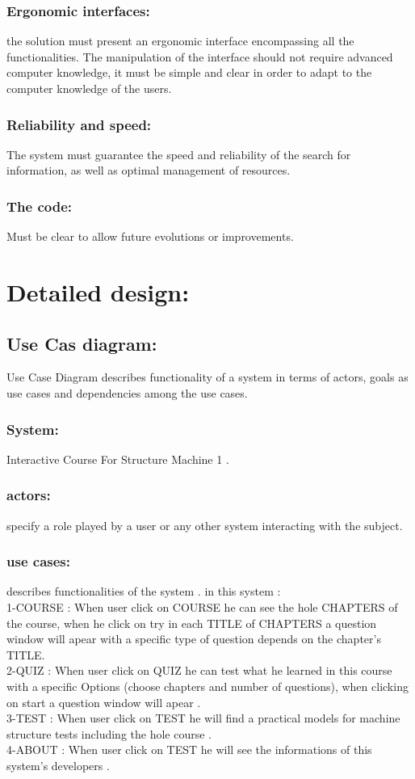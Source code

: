 \subsubsection{Ergonomic interfaces:}
the solution must present an ergonomic interface encompassing all the functionalities. The manipulation of the interface should not require advanced computer knowledge, it must be simple and clear in order to adapt to the computer knowledge of the users.
\subsubsection{Reliability and speed:}
The system must guarantee the speed and reliability of the search for information, as well as optimal management of resources.
\subsubsection{The code:}
Must be clear to allow future evolutions or improvements.






\section{Detailed design:}

\subsection{Use Cas diagram:}
Use Case Diagram describes functionality of a system in terms of actors, goals as use cases and dependencies among the use cases.\cite{Techopedia-UML}
\subsubsection{System:}
Interactive Course For Structure Machine 1 .
\subsubsection{actors:}
specify a role played by a user or any other system interacting with the subject.\cite{Techopedia-UML}
\subsubsection{use cases:}
describes functionalities of the system .
in this system :\\
1-COURSE : When user click on COURSE he can see the hole CHAPTERS of the course, when he click on try in each TITLE of CHAPTERS a question window will apear with a specific type of question depends on the chapter's TITLE.  \\
2-QUIZ : When user click on QUIZ he can test what he learned in this course with a specific Options (choose chapters and number of questions), when clicking on start a question window will apear .\\
3-TEST : When user click on TEST he will find a practical models for machine structure tests including the hole course . \\
4-ABOUT : When user click on TEST he will see the informations of this system's developers . \\

